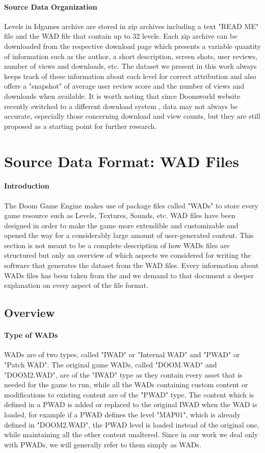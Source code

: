 \paragraph{Source Data Organization} Levels in Idgames archive are stored in zip archives including a text "READ ME" file and the \gls{WAD} file that contain up to 32 levels. 
Each zip archive can be downloaded from the respective download page which presents a variable quantity of information such as the author, a short description, screen shots, user reviews, number of views and downloads, etc.
The dataset we present in this work always keeps track of these information about each level for correct attribution and also offers a "snapshot" of average user review score and the number of views and downloads when available. It is worth noting that since Doomworld website recently switched to a different download system \cite{wiki:doomworld}, data may not always be accurate, especially those concerning download and view counts, but they are still proposed as a starting point for further research. 
\section{Source Data Format: WAD Files}
\label{sec:WAD} 
\paragraph{Introduction} The Doom Game Engine \cite{doomengine} makes use of package files called "\glspl{WAD}" to store every game resource such as Levels, Textures, Sounds, etc. 
\gls{WAD} files have been designed in order to make the game more extendible and customizable and opened the way for a considerably large amount of user-generated content. This section is not meant to be a complete description of how \glspl{WAD} files are structured but only an overview of which aspects we considered for writing the software that generates the dataset from the \gls{WAD} files. Every information about \glspl{WAD} files has been taken from the  \cite{doomspecs} and we demand to that document a deeper explanation on every aspect of the file format.
\subsection{Overview}
\paragraph{Type of WADs}
\glspl{WAD} are of two types, called "IWAD" or "Internal WAD" and "PWAD" or "Patch WAD". The original game \glspl{WAD}, called "DOOM.WAD" and "DOOM2.WAD", are of the "IWAD" type as they contain every asset that is needed for the game to run, while all the \glspl{WAD} containing custom content or modifications to existing content are of the "PWAD" type. The content which is defined in a PWAD is added or replaced to the original IWAD when the \gls{WAD} is loaded, for example if a PWAD defines the level "MAP01", which is already defined in "DOOM2.WAD", the PWAD level is loaded instead of the original one, while maintaining all the other content unaltered.
Since in our work we deal only with PWADs, we will generally refer to them simply as \glspl{WAD}.


